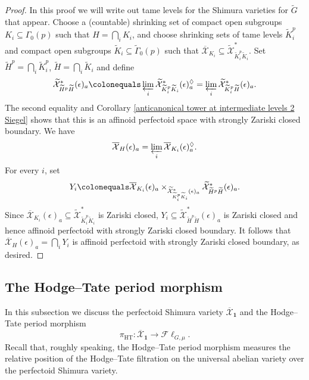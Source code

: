 \documentclass{amsart}
\theoremstyle{remark}
\numberwithin{equation}{subsection}
\newcommand{\cX}{{\mathcal X}}
\newcommand*{\invlim}{\varprojlim}
\newcommand{\mbf}{\mathbf}
\newcommand{\tGam}{\widetilde{\Gamma}}
\newcommand{\tG}{\widetilde{G}}
\newcommand{\tK}{{\widetilde{K}}}
\newcommand{\tH}{\widetilde{H}}
\newcommand{\ocX}{\overline{\mathcal{X}}}
\newcommand{\ol}{\overline}
\newcommand{\wt}{\widetilde}
\newcommand{\sub}{\subseteq}
\newcommand{\defeq}{\colonequals}
\renewcommand{\(}{\left(}
\renewcommand{\)}{\right)}
\begin{document}
\begin{proof}
In this proof we will write out tame levels for the Shimura varieties for $\tG$ that appear. Choose a (countable) shrinking set of compact open subgroups $K_{i} \sub \Gamma_{0}(p)$ such that $H= \bigcap_{i} K_{i}$, and choose shrinking sets of tame levels $\tK_{i}^{p}$ and compact open subgroups $\tK_{i} \sub \tGam_{0}(p)$ such that $\ol{\cX}_{K_{i}} \sub \wt{\cX}^{\ast}_{\tK_{i}^{p}\tK_{i}}$. Set $\tH^{p}=\bigcap_{i}\tK_{i}^{p}$, $\tH=\bigcap_{i}\tK_{i}$ and define
\[
 \wt{\cX}^{\ast}_{\tH^{p}\tH}(\epsilon)_{a} \defeq \invlim_{i} \wt{\cX}^{\ast}_{\tK_{i}^{p}\tK_{i}}(\epsilon)_{a}^{\lozenge} = \invlim_{i} \wt{\cX}^{\ast}_{\tK_{i}^{p}\tH}(\epsilon)_{a}.
 \]
The second equality and Corollary \ref{anticanonical tower at intermediate levels 2 Siegel} shows that this is an affinoid perfectoid space with strongly Zariski closed boundary. We have 
\[
\ocX_{H}(\epsilon)_{a} = \invlim_{i} \ol{\cX}_{K_{i}}(\epsilon)_{a}^{\lozenge}.
\]
For every $i$, set 
\[
Y_{i} \defeq \ol{\cX}_{K_{i}}(\epsilon)_{a} \times_{\wt{\cX}^{\ast}_{\tK_{i}^{p}\tK_{i}}(\epsilon)_{a}} \wt{\cX}^{\ast}_{\tH^{p}\tH}(\epsilon)_{a}.
\]
Since $\ol{\cX}_{K_{i}}(\epsilon)_{a} \sub \wt{\cX}^{\ast}_{\tK_{i}^{p}\tK_{i}}$ is Zariski closed, $Y_{i} \sub  \wt{\cX}^{\ast}_{\tH^{p}\tH}(\epsilon)_{a} $ is Zariski closed and hence affinoid perfectoid with strongly Zariski closed boundary. It follows that $\ocX_{H}(\epsilon)_{a} = \bigcap_{i} Y_{i}$ is affinoid perfectoid with strongly Zariski closed boundary, as desired.
\end{proof}

\subsection{The Hodge--Tate period morphism}\label{hodgetatemapsection}
In this subsection we discuss the perfectoid Shimura variety $\ocX_{\mbf{1}}$ 
and the Hodge--Tate period morphism 
\[
\pi_{\mathrm{HT}}\colon \ocX_{\mbf{1}} \to \mathscr{F}\ell_{G,\mu}.
\]
Recall that, roughly speaking, the Hodge--Tate period morphism measures the relative position of the Hodge--Tate filtration on the
universal abelian variety over the perfectoid Shimura variety. 

\medskip
\end{document}
